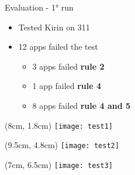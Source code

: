 \begin{frame}{Evaluation - \ang{1} run}

\begin{center}
  \begin{itemize}
    \item Tested Kirin on 311

    \vfill

    \item 12 apps failed the test
    \begin{itemize}
    \item 3 apps failed \textbf{rule 2}

    \item 1 app failed \textbf{rule 4}

    \item 8 apps failed \textbf{rule 4 and 5}
    \end{itemize}
  \end{itemize}
\end{center}

\begin{textblock*}{1cm}(8cm, 1.8cm)
    \texttt{[image: test1]}
\end{textblock*}

\begin{textblock*}{1cm}(9.5cm, 4.8cm)
    \texttt{[image: test2]}
\end{textblock*}

\begin{textblock*}{1cm}(7cm, 6.5cm)
    \texttt{[image: test3]}
\end{textblock*}

\end{frame}